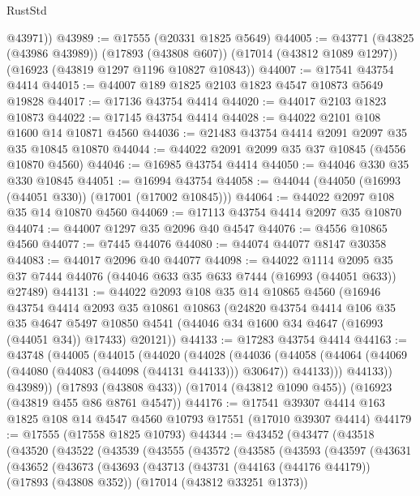 \begin{lexlean}{RustStd}
\begin{coremodule}
{\begin{coremodule}
{{{{{{{{{{{{{{{{{{{{{{{{{{{{{{{{{{{{{{{{{{{{{{{{{{{{{{{        @43971))
@43989 := @17555 (@20331 @1825 @5649)
@44005 := @43771
    (@43825 (@43986 @43989))
    (@17893 (@43808 @607))
    (@17014 (@43812 @1089 @1297))
    (@16923 (@43819 @1297 @1196 @10827 @10843))
@44007 := @17541 @43754 @4414
@44015 := @44007 @189 @1825 @2103 @1823 @4547 @10873 @5649 @19828
@44017 := @17136 @43754 @4414
@44020 := @44017 @2103 @1823 @10873
@44022 := @17145 @43754 @4414
@44028 := @44022 @2101 @108 @1600 @14 @10871 @4560
@44036 := @21483 @43754 @4414 @2091 @2097 @35 @35 @10845 @10870
@44044 := @44022 @2091 @2099 @35 @37 @10845 (@4556 @10870 @4560)
@44046 := @16985 @43754 @4414
@44050 := @44046 @330 @35 @330 @10845
@44051 := @16994 @43754
@44058 := @44044 (@44050 (@16993 (@44051 @330)) (@17001 (@17002 @10845)))
@44064 := @44022 @2097 @108 @35 @14 @10870 @4560
@44069 := @17113 @43754 @4414 @2097 @35 @10870
@44074 := @44007 @1297 @35 @2096 @40 @4547
@44076 := @4556 @10865 @4560
@44077 := @7445 @44076
@44080 := @44074 @44077 @8147 @30358
@44083 := @44017 @2096 @40 @44077
@44098 := @44022
    @1114
    @2095
    @35
    @37
    @7444
    @44076
    (@44046 @633 @35 @633 @7444 (@16993 (@44051 @633)) @27489)
@44131 := @44022
    @2093
    @108
    @35
    @14
    @10865
    @4560
    (@16946
      @43754
      @4414
      @2093
      @35
      @10861
      @10863
      (@24820
        @43754
        @4414
        @106
        @35
        @35
        @4647
        @5497
        @10850
        @4541
        (@44046 @34 @1600 @34 @4647 (@16993 (@44051 @34)) @17433)
        @20121))
@44133 := @17283 @43754 @4414
@44163 := @43748
    (@44005
      (@44015
        (@44020
          (@44028
            (@44036
              (@44058 (@44064 (@44069 (@44080 (@44083 (@44098 (@44131 @44133))) @30647)) @44133)))
            @44133))
        @43989))
    (@17893 (@43808 @433))
    (@17014 (@43812 @1090 @455))
    (@16923 (@43819 @455 @86 @8761 @4547))
@44176 := @17541 @39307 @4414 @163 @1825 @108 @14 @4547 @4560 @10793 @17551 (@17010 @39307 @4414)
@44179 := @17555 (@17558 @1825 @10793)
@44344 := @43452
    (@43477
      (@43518
        (@43520
          (@43522
            (@43539
              (@43555
                (@43572
                  (@43585
                    (@43593
                      (@43597
                        (@43631
                          (@43652
                            (@43673
                              (@43693
                                (@43713
                                  (@43731
                                    (@44163 (@44176 @44179))
                                    (@17893 (@43808 @352))
                                    (@17014 (@43812 @33251 @1373))
}}}}}}}}}}}}}}}}}}}}}}}}}}}}}}}}}}}}}}}}}}}}}}}}}}}}}}}
\end{coremodule}}
\end{coremodule}
\end{lexlean}
